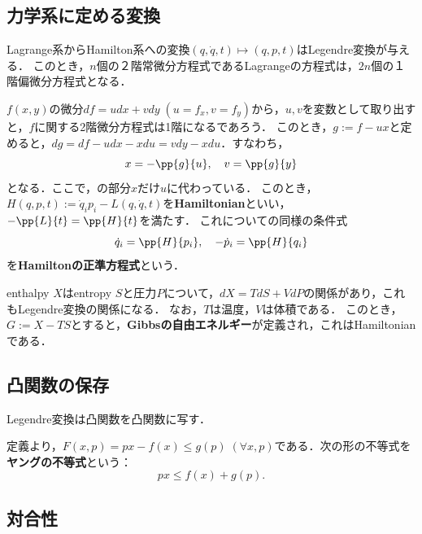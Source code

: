 \documentclass[uplatex,dvipdfmx]{jsreport}
\begin{document}
\subsection{力学系に定める変換}

\begin{tcolorbox}[colframe=ForestGreen, colback=ForestGreen!10!white,breakable,colbacktitle=ForestGreen!40!white,coltitle=black,fonttitle=\bfseries\sffamily,
title=]
    Lagrange系からHamilton系への変換$(q,\dot{q},t)\mapsto(q,p,t)$はLegendre変換が与える．
    このとき，$n$個の２階常微分方程式であるLagrangeの方程式は，$2n$個の１階偏微分方程式となる．
\end{tcolorbox}

\begin{discussion}
    $f(x,y)$の微分$df=udx+vdy\;(u=f_x,v=f_y)$から，$u,v$を変数として取り出すと，$f$に関する2階微分方程式は1階になるであろう．
    このとき，$g:=f-ux$と定めると，$dg=df-udx-xdu=vdy-xdu$．すなわち，
    \[x=-\pp{g}{u},\quad v=\pp{g}{y}\]
    となる．ここで，の部分$x$だけ$u$に代わっている．
    このとき，$H(q,p,t):=\dot{q}_ip_i-L(q,\dot{q},t)$を\textbf{Hamiltonian}といい，$-\pp{L}{t}=\pp{H}{t}$を満たす．
    これについての同様の条件式
    \[\dot{q}_i=\pp{H}{p_i},\quad-\dot{p}_i=\pp{H}{q_i}\]
    を\textbf{Hamiltonの正準方程式}という．
\end{discussion}
\begin{example}
    enthalpy $X$はentropy $S$と圧力$P$について，$dX=TdS+VdP$の関係があり，これもLegendre変換の関係になる．
    なお，$T$は温度，$V$は体積である．
    このとき，$G:=X-TS$とすると，\textbf{Gibbsの自由エネルギー}が定義され，これはHamiltonianである．
\end{example}

\subsection{凸関数の保存}

\begin{proposition}
    Legendre変換は凸関数を凸関数に写す．
\end{proposition}

\begin{definition}
    定義より，$F(x,p)=px-f(x)\le g(p)\;(\forall x,p)$である．次の形の不等式を\textbf{ヤングの不等式}という：
    \[ px\le f(x)+g(p). \]
\end{definition}

\subsection{対合性}
\end{document}
